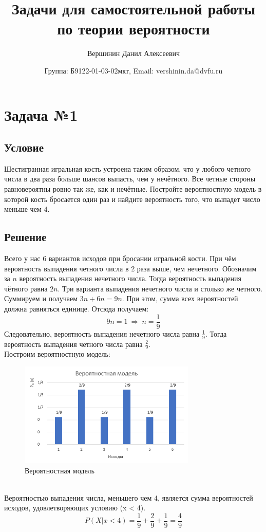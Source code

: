 \documentclass{article}
\title{\vspace{10cm}Задачи для самостоятельной работы по теории
вероятности}
\author{Вершинин Данил Алексеевич}
\date{Группа: Б9122-01-03-02мкт, Email: vershinin.da@dvfu.ru}
\begin{document}
\maketitle
\newpage
\section*{Задача №1}
\subsection*{Условие}
Шестигранная игральная кость устроена таким образом, что у любого
четного числа в два раза больше шансов выпасть, чем у нечётного. Все четные
стороны равновероятны ровно так же, как и нечётные. Постройте вероятностную
модель в которой кость бросается один раз и найдите вероятность того, что выпадет
число меньше чем 4. 
\subsection*{Решение}
Всего у нас 6 вариантов исходов при бросании игральной кости. При чём вероятность выпадения четного числа в 2 раза выше, чем нечетного. Обозначим за $n$ вероятность выпадения нечетного числа. Тогда вероятность выпадения чётного равна $2n$. Три варианта выпадения нечетного числа и столько же четного. Суммируем и получаем $3n + 6n = 9n$. При этом, сумма всех вероятностей должна равняться единице. Отсюда получаем:
\[
    9n = 1 \ \Rightarrow \ n = \frac{1}{9}
\]
Следовательно, вероятность выпадения нечетного числа равна $\frac{1}{9}$. Тогда вероятность выпадения четного числа равна $\frac{2}{9}$. \\
Построим вероятностную модель:\\
\begin{figure}[h]
    \centering
    \includegraphics[width=0.75\textwidth]{1.png}
    \caption{Вероятностная модель}
    \label{fig:prob_dia}
\end{figure}\\
Вероятностью выпадения числа, меньшего чем 4, является сумма вероятностей исходов, удовлетворяющих условию (x < 4).
\[
    P(X| x < 4) = \frac{1}{9} + \frac{2}{9} + \frac{1}{9} = \frac{4}{9}
\]
\end{document}
